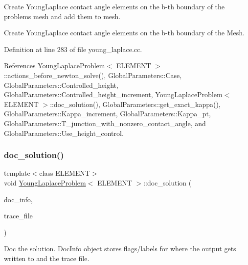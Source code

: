Create Young\+Laplace contact angle elements on the b-\/th boundary of the problem\textquotesingle{}s mesh and add them to mesh. 

Create Young\+Laplace contact angle elements on the b-\/th boundary of the Mesh. 

Definition at line 283 of file young\+\_\+laplace.\+cc.



References Young\+Laplace\+Problem$<$ E\+L\+E\+M\+E\+N\+T $>$\+::actions\+\_\+before\+\_\+newton\+\_\+solve(), Global\+Parameters\+::\+Case, Global\+Parameters\+::\+Controlled\+\_\+height, Global\+Parameters\+::\+Controlled\+\_\+height\+\_\+increment, Young\+Laplace\+Problem$<$ E\+L\+E\+M\+E\+N\+T $>$\+::doc\+\_\+solution(), Global\+Parameters\+::get\+\_\+exact\+\_\+kappa(), Global\+Parameters\+::\+Kappa\+\_\+increment, Global\+Parameters\+::\+Kappa\+\_\+pt, Global\+Parameters\+::\+T\+\_\+junction\+\_\+with\+\_\+nonzero\+\_\+contact\+\_\+angle, and Global\+Parameters\+::\+Use\+\_\+height\+\_\+control.

\mbox{\label{classYoungLaplaceProblem_a16f10e66457718eca76d1335dbed8f12}} 
\subsubsection{\texorpdfstring{doc\+\_\+solution()}{doc\_solution()}\hspace{0.1cm}{\footnotesize\ttfamily [1/2]}}
{\footnotesize\ttfamily template$<$class E\+L\+E\+M\+E\+NT$>$ \\
void \hyperlink{classYoungLaplaceProblem}{Young\+Laplace\+Problem}$<$ E\+L\+E\+M\+E\+NT $>$\+::doc\+\_\+solution (\begin{DoxyParamCaption}\item[{Doc\+Info \&}]{doc\+\_\+info,  }\item[{ofstream \&}]{trace\+\_\+file }\end{DoxyParamCaption})}



Doc the solution. Doc\+Info object stores flags/labels for where the output gets written to and the trace file. 

\mbox{\label{classYoungLaplaceProblem_a16f10e66457718eca76d1335dbed8f12}} 
